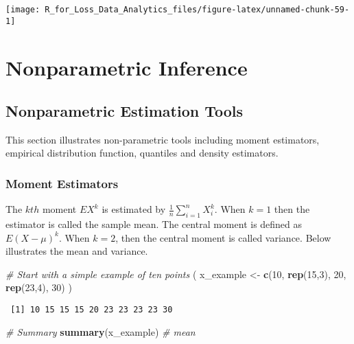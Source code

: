\documentclass[]{book}
\newenvironment{Shaded}{\begin{snugshade}}{\end{snugshade}}
\newcommand{\KeywordTok}[1]{\textcolor[rgb]{0.13,0.29,0.53}{\textbf{#1}}}
\newcommand{\DecValTok}[1]{\textcolor[rgb]{0.00,0.00,0.81}{#1}}
\newcommand{\StringTok}[1]{\textcolor[rgb]{0.31,0.60,0.02}{#1}}
\newcommand{\CommentTok}[1]{\textcolor[rgb]{0.56,0.35,0.01}{\textit{#1}}}
\newcommand{\NormalTok}[1]{#1}
\theoremstyle{definition}
\theoremstyle{definition}
\theoremstyle{definition}
\theoremstyle{remark}
\begin{document}
\begin{center}\texttt{[image: R\_for\_Loss\_Data\_Analytics\_files/figure-latex/unnamed-chunk-59-1]} \end{center}

\section{Nonparametric Inference}\label{nonparametric-inference}

\subsection{Nonparametric Estimation
Tools}\label{nonparametric-estimation-tools}

This section illustrates non-parametric tools including moment
estimators, empirical distribution function, quantiles and density
estimators.

\subsubsection{Moment Estimators}\label{moment-estimators}

The \(kth\) moment \(EX^k\) is estimated by
\(\frac{1}{n}\sum_{i=1}^{n}X_i^k\). When \(k=1\) then the estimator is
called the sample mean. The central moment is defined as \(E(X-\mu)^k\).
When \(k=2\), then the central moment is called variance. Below
illustrates the mean and variance.

\begin{Shaded}
\begin{Highlighting}[]
\CommentTok{# Start with a simple example of ten points}
\NormalTok{( x_example <-}\StringTok{ }\KeywordTok{c}\NormalTok{(}\DecValTok{10}\NormalTok{, }\KeywordTok{rep}\NormalTok{(}\DecValTok{15}\NormalTok{,}\DecValTok{3}\NormalTok{), }\DecValTok{20}\NormalTok{, }\KeywordTok{rep}\NormalTok{(}\DecValTok{23}\NormalTok{,}\DecValTok{4}\NormalTok{), }\DecValTok{30}\NormalTok{) )}
\end{Highlighting}
\end{Shaded}

\begin{verbatim}
 [1] 10 15 15 15 20 23 23 23 23 30
\end{verbatim}

\begin{Shaded}
\begin{Highlighting}[]
\CommentTok{# Summary}
\KeywordTok{summary}\NormalTok{(x_example)  }\CommentTok{# mean }
\end{Highlighting}
\end{Shaded}
\end{document}
